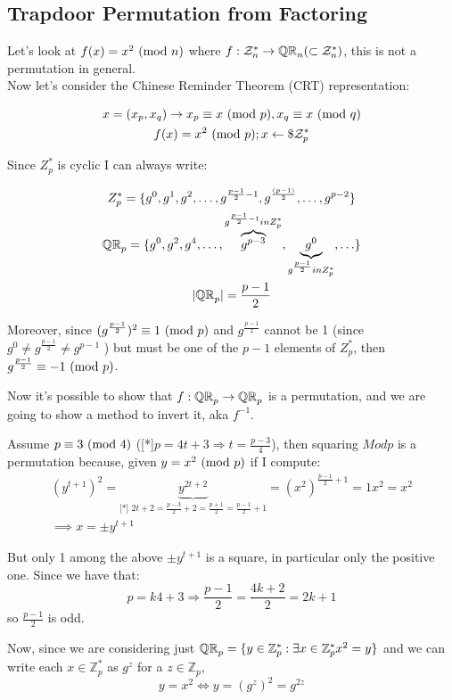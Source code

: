 \subsection{Trapdoor Permutation from Factoring}
Let's look at $f(x)=x^2\Mod{n}$ where $f: \Z_n^* \to \QR[n] (\subset \Z_n^*)$, this is not a permutation in general.\\
Now let's consider the Chinese Reminder Theorem (CRT) representation:

    \begin{gather*}
        x=(x_p,x_q) \rightarrow x_p\equiv x\Mod{p} , x_q\equiv x\Mod{q}\\
        f(x)=x^2\Mod{p}; x \from \$ \Z_p^*
    \end{gather*}

Since $Z_p^*$ is cyclic I can always write:

\begin{gather*}
    Z_p^*=\{g^0,g^1,g^2,\ldots,g^{\frac{p-1}{2}-1},g^{\frac{(p-1)}{2}},\ldots,g^{p-2} \}\\
    \QR[p]=\{g^0,g^2,g^4,\ldots,\overbrace{g^{p-3}}^{g^{\frac{p-1}{2}-1} in Z_p^*},\underbrace{g^0}_{g^{\frac{p-1}{2}}in Z_p^*},\ldots\}\\
    |\QR[p]|=\frac{p-1}{2}
\end{gather*}

Moreover, since $(g^{\frac{p-1}{2}})^2 \equiv 1 \Mod{p} $ and $g^{\frac{p-1}{2}}$
cannot be 1 (since $g^{0}\not=g^{\frac{p-1}{2}}\not=g^{p-1}$ ) but must be one
of the $p-1$ elements of $Z_{p}^{*}$, then
$g^{\frac{p-1}{2}} \equiv -1 \Mod{p}$.

Now it's possible to show that $f: \QR[p]\to \QR[p] $ is a permutation, and we are going to show a method to invert it, aka $f^{-1}$.

Assume $p\equiv 3 \Mod{4}$
([*]$p=4t+3\Rightarrow t=\frac{p-3}{4}$), then squaring $Mod{p}$ is a permutation because, given
\underline{$y=x^2 \Mod{p}$} if I compute: \begin{gather*}
    (y^{t+1})^2=\underbrace{y^{2t+2}}_{\text{[*]
    }2t+2=\frac{p-3}{2}+2=\frac{p+1}{2}=\frac{p-1}{2}+1}=(x^2)^{\frac{p-1}{2}+1}=1x^2=x^2\\
    \implies x=\pm y^{t+1} \end{gather*}

But only 1 among the above $\pm y^{t+1}$ is a square, in particular only the
positive one. Since we have that:
\[ 
    p=k4+3 \Rightarrow \frac{p-1}{2}=\frac{4k+2}{2}=2k+1
\]
so $\frac{p-1}{2}$ is odd.

Now, since we are considering just $\QR[p]=\{y \in \mathbb{Z}_{p}^{*} : \exists x \in \mathbb{Z}_{p}^{*} x^{2}=y\}$ and we can write each $x \in \mathbb{Z}_{p}^{*} $ as $g^{z}$ for a $z \in \mathbb{Z}_{p}$, 
\[
    y=x^{2} \Leftrightarrow y=(g^{z})^{2}=g^{2z}
\]

